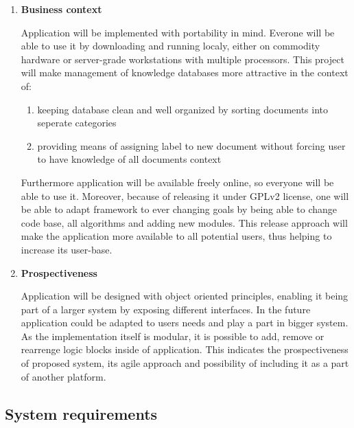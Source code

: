 	\begin{enumerate}
	
	\item \textbf{Business context}
	
	Application will be implemented with portability in mind. Everone will be able to use it by downloading and running localy, either on commodity hardware or server-grade workstations with multiple processors. This project will make management of knowledge databases more attractive in the context of:
	
	\begin{enumerate}
		\item keeping database clean and well organized by sorting documents into seperate categories
		\item providing means of assigning label to new document without forcing user to have knowledge of all documents context
	\end{enumerate}
	
	Furthermore application will be available freely online, so everyone will be able to use it. Moreover, because of releasing it under GPLv2 license, one will be able to adapt framework to ever changing goals by being able to change code base, all algorithms and adding new modules. This release approach will make the application more available to all potential users, thus helping to increase its user-base.  
	
	\item \textbf{Prospectiveness}
	
	Application will be designed with object oriented principles, enabling it being part of a larger system by exposing different interfaces. In the future application could be adapted to users needs and play a part in bigger system. As the implementation itself is modular, it is possible to add, remove or rearrenge logic blocks inside of application. This indicates the prospectiveness of proposed system, its agile approach and possibility of including it as a part of another platform.
	
	\end{enumerate}

\subsection{System requirements}
